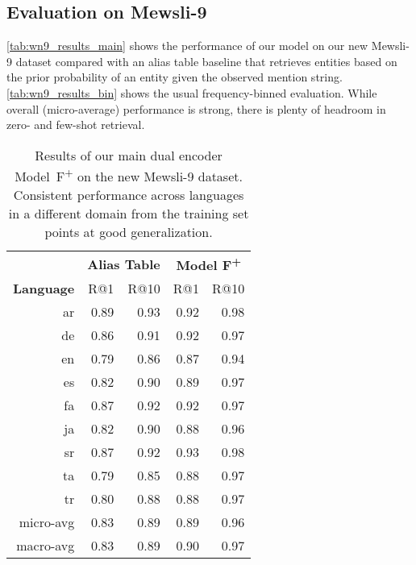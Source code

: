 \documentclass[11pt,a4paper]{article}
\begin{document}
\subsection{Evaluation on Mewsli-9}\label{sec:eval_wikinews9}
\autoref{tab:wn9_results_main} shows the performance of our model on our new Mewsli-9 dataset compared with an alias table baseline that retrieves entities based on the prior probability of an entity given the observed mention string.
\autoref{tab:wn9_results_bin} shows the usual frequency-binned evaluation. While overall (micro-average) performance is strong, there is plenty of headroom in zero- and few-shot retrieval.

\begin{table}[t]
\centering
\begin{tabular}{r rrrr} \toprule
& \multicolumn{2}{c}{\bf Alias Table} & \multicolumn{2}{c}{\bf Model F\textsuperscript{+}} \\ \cmidrule(lr){2-3} \cmidrule(lr){4-5}
\textbf{Language} & R@1 & R@10 & R@1 & R@10 \\ \midrule
ar & 0.89 & 0.93 & 0.92 & 0.98 \\
de & 0.86 & 0.91 & 0.92 & 0.97 \\
en & 0.79 & 0.86 & 0.87 & 0.94 \\
es & 0.82 & 0.90 & 0.89 & 0.97 \\
fa & 0.87 & 0.92 & 0.92 & 0.97 \\
ja & 0.82 & 0.90 & 0.88 & 0.96 \\
sr & 0.87 & 0.92 & 0.93 & 0.98 \\
ta & 0.79 & 0.85 & 0.88 & 0.97 \\
tr & 0.80 & 0.88 & 0.88 & 0.97 \\ \midrule
micro-avg & 0.83 & 0.89 & 0.89 & 0.96 \\
macro-avg & 0.83 & 0.89 & 0.90 & 0.97 \\ \bottomrule
\end{tabular}
\caption{Results of our main dual encoder Model~F\textsuperscript{+} on the new Mewsli-9 dataset.
Consistent performance across languages in a different domain from the training set points at good generalization.
\label{tab:wn9_results_main}}
\end{table}
\end{document}
